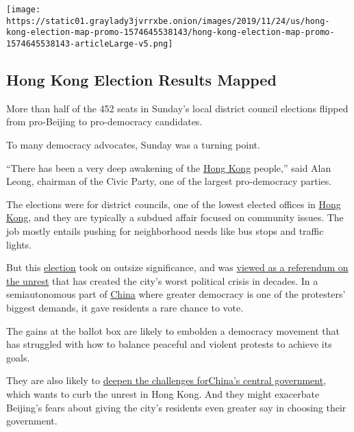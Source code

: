 \href{https://www.nytimes3xbfgragh.onion/interactive/2019/11/24/world/asia/hong-kong-election-results.html}{}

\texttt{[image: https://static01.graylady3jvrrxbe.onion/images/2019/11/24/us/hong-kong-election-map-promo-1574645538143/hong-kong-election-map-promo-1574645538143-articleLarge-v5.png]}

\hypertarget{hong-kong-election-results-mapped}{%
\subsection{Hong Kong Election Results
Mapped}\label{hong-kong-election-results-mapped}}

More than half of the 452 seats in Sunday's local district council
elections flipped from pro-Beijing to pro-democracy candidates.

To many democracy advocates, Sunday was a turning point.

``There has been a very deep awakening of the
\href{https://www.nytimes3xbfgragh.onion/2019/11/25/world/asia/hong-kong-election-winners.html}{Hong
Kong} people,'' said Alan Leong, chairman of the Civic Party, one of the
largest pro-democracy parties.

The elections were for district councils, one of the lowest elected
offices in
\href{https://www.nytimes3xbfgragh.onion/2019/11/25/world/asia/hong-kong-election-winners.html}{Hong
Kong}, and they are typically a subdued affair focused on community
issues. The job mostly entails pushing for neighborhood needs like bus
stops and traffic lights.

But this
\href{https://www.nytimes3xbfgragh.onion/2019/11/25/world/asia/hong-kong-election-winners.html}{election}
took on outsize significance, and was
\href{https://www.nytimes3xbfgragh.onion/2019/11/23/world/asia/hong-kong-election-protests-district-council.html}{viewed
as a referendum on the unrest} that has created the city's worst
political crisis in decades. In a semiautonomous part of
\href{https://www.nytimes3xbfgragh.onion/2019/11/25/world/asia/hong-kong-election-winners.html}{China}
where greater democracy is one of the protesters' biggest demands, it
gave residents a rare chance to vote.

The gains at the ballot box are likely to embolden a democracy movement
that has struggled with how to balance peaceful and violent protests to
achieve its goals.

They are also likely to
\href{https://www.nytimes3xbfgragh.onion/2019/11/25/world/asia/hong-kong-election-protests.html?action=click\&module=Top\%20Stories\&pgtype=Homepage}{deepen
the challenges
for}\href{https://www.nytimes3xbfgragh.onion/2019/11/25/world/asia/hong-kong-election-protests.html?action=click\&module=Top\%20Stories\&pgtype=Homepage}{China's
central government}, which wants to curb the unrest in Hong Kong. And
they might exacerbate Beijing's fears about giving the city's residents
even greater say in choosing their government.


